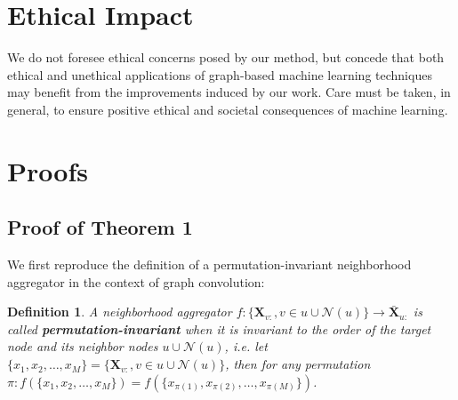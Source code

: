 \documentclass[letterpaper]{article} \usepackage{aaai21}  \usepackage{times}  \usepackage{helvet} \usepackage{courier}  \usepackage[hyphens]{url}  \usepackage{graphicx} \urlstyle{rm} \def\UrlFont{\rm}  \usepackage{natbib}  \usepackage{caption} \frenchspacing  \setlength{\pdfpagewidth}{8.5in}  \setlength{\pdfpageheight}{11in}
\newtheorem{dfn}{Definition}
\begin{document}
\section*{Ethical Impact}




We do not foresee ethical concerns posed by our method, but concede that both ethical and unethical applications of graph-based machine learning techniques may benefit from the improvements induced by our work. Care must be taken, in general, to ensure positive ethical and societal consequences of machine learning.




\clearpage

\appendix
\section{Proofs}
\subsection{Proof of Theorem 1}
\label{appn:proof}
We first reproduce the definition of a permutation-invariant neighborhood aggregator \cite{xu2018powerful} in the context of graph convolution:

\begin{dfn}
A neighborhood aggregator $f:\{\mathbf{X}_{v:}, v \in u\cup\mathcal{N}(u)\} \rightarrow \bar{\mathbf{X}}_{u:}$ is called \textbf{permutation-invariant} when it is invariant to the order of the target node and its neighbor nodes $u\cup\mathcal{N}(u)$, i.e. let $\{x_1, x_2, \dots, x_M\} = \{\mathbf{X}_{v:}, v \in u\cup\mathcal{N}(u)\}$, then for any permutation $\pi : f(\{x_1, x_2, \dots, x_M\}) = f(\{x_{\pi(1)}, x_{\pi(2)}, \dots, x_{\pi(M)}\})$.
\end{dfn}
\end{document}
